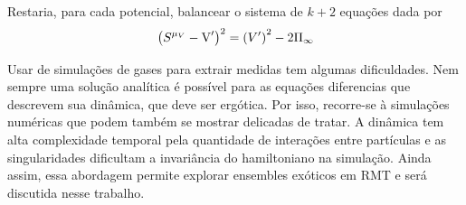 \documentclass[12pt]{report}
\begin{document}
Restaria, para cada potencial, balancear o sistema de $k+2$ equações dada por
\[
\left( S^{\mu_{V}} - \operatorname{V}' \right)^2 = \left( V' \right)^2 - 2 \Pi_{\infty}
\]

Usar de simulações de gases para extrair medidas tem algumas dificuldades. Nem sempre uma solução analítica é possível para as equações diferencias que descrevem sua dinâmica, que deve ser ergótica. Por isso, recorre-se à simulações numéricas que podem também se mostrar delicadas de tratar. A dinâmica tem alta complexidade temporal pela quantidade de interações entre partículas e as singularidades dificultam a invariância do hamiltoniano na simulação. Ainda assim, essa abordagem permite explorar ensembles exóticos em RMT e será discutida nesse trabalho.
\end{document}
